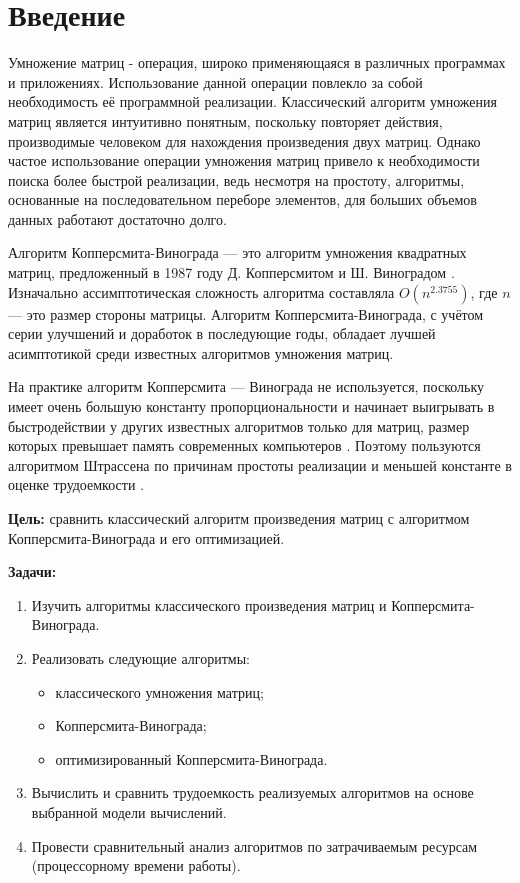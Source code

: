 \documentclass[12pt]{report}
\begin{document}
    \sloppy
    
    \tableofcontents

    \newpage
    \chapter*{Введение}

    Умножение матриц - операция, широко применяющаяся в различных программах и приложениях.
    Использование данной операции повлекло за собой необходимость её программной реализации.
    Классический алгоритм умножения матриц является интуитивно понятным, поскольку повторяет действия,
    производимые человеком для нахождения произведения двух матриц.
    Однако частое использование операции умножения матриц привело к необходимости поиска более
    быстрой реализации, ведь несмотря на простоту, алгоритмы, основанные на последовательном переборе
    элементов, для больших объемов данных работают достаточно долго.
    
    Алгоритм Копперсмита-Винограда --- это алгоритм умножения квадратных матриц,
    предложенный в 1987 году Д. Копперсмитом и Ш. Виноградом \cite{CoppersmithAndWinograd}.
    Изначально ассимптотическая сложность алгоритма составляла $O(n^{2.3755})$, где $n$ --- это размер
    стороны матрицы. Алгоритм Копперсмита-Винограда, с учётом серии улучшений и доработок в последующие годы,
    обладает лучшей асимптотикой среди известных алгоритмов умножения матриц.
    
    На практике алгоритм Копперсмита — Винограда не используется, поскольку имеет очень большую константу
    пропорциональности и начинает выигрывать в быстродействии у других известных алгоритмов только для матриц,
    размер которых превышает память современных компьютеров \cite{RobinsonSara}.
    Поэтому пользуются алгоритмом Штрассена по причинам простоты реализации и меньшей константе в оценке
    трудоемкости \cite{Strassen}.

    \textbf{Цель:} сравнить классический алгоритм произведения матриц с алгоритмом
    Копперсмита-Винограда и его оптимизацией.

    \textbf{Задачи:}
    \begin{enumerate}
        \item Изучить алгоритмы классического произведения матриц и Копперсмита-Винограда.
        \item Реализовать следующие алгоритмы:
        \begin{itemize}
            \item классического умножения матриц;
            \item Копперсмита-Винограда;
            \item оптимизированный Копперсмита-Винограда.
        \end{itemize}
        \item Вычислить и сравнить трудоемкость реализуемых алгоритмов на основе выбранной модели вычислений.
        \item Провести сравнительный анализ алгоритмов по затрачиваемым ресурсам (процессорному времени работы).
    \end{enumerate}
    \newpage
\end{document}
